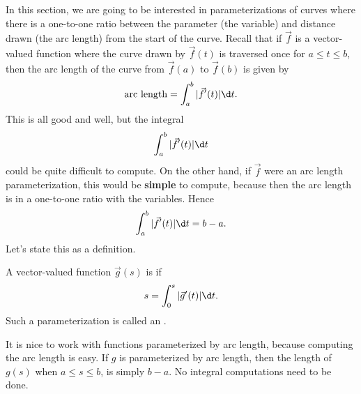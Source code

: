 \documentclass{ximera}
\begin{document}
In this
section, we are going to be interested in parameterizations of curves
where there is a one-to-one ratio between the parameter (the variable)
and distance drawn (the arc length) from the start of the curve.
Recall that if $\vec{f}$ is a vector-valued function where the curve
drawn by $\vec{f}(t)$ is traversed once for $a\le t\le b$, then the
arc length of the curve from $\vec{f}(a)$ to $\vec{f}(b)$ is given by
\[
\text{arc length} = \int_a^b |\vec{f}'(t)|\d t.
\]
This is all good and well, but the integral
\[
\int_a^b |\vec{f}'(t)|\d t
\]
could be quite difficult to compute. On the other hand, if $\vec{f}$
were an arc length parameterization, this would be \textbf{simple} to
compute, because then the arc length is in a one-to-one ratio with the
variables. Hence
\[
\int_a^b |\vec{f}'(t)|\d t = b-a.
\]
Let's state this as a definition.

\begin{definition}
  A vector-valued function $\vec{g}(s)$ is  if
  \[
  s = \int_0^s |\vec{g}'(t)|\d t.
  \]
  Such a parameterization is called an .
\end{definition}
It is nice to work with functions parameterized by arc length,
because computing the arc length is easy. If $g$ is parameterized by
arc length, then the length of $g(s)$ when $a\le s\le b$, is simply
$b-a$. No integral computations need to be done.
\end{document}
